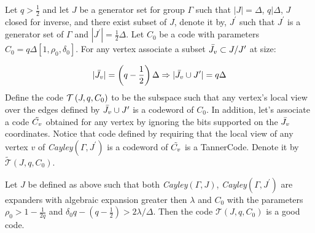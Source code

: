 \begin{definition}\label{testtaner} Let $q > \frac{1}{2}$ and let $J$ be a generator set for group $\Gamma$ such that $|J| = \Delta$, $q | \Delta $, $J$ closed for inverse, and there exist subset of $J$, denote it by, $J^{\prime}$ such that $J^{\prime}$ is a generator set of $\Gamma$ and $|J^{\prime}| = \frac{1}{2}\Delta$. Let $C_{0}$ be a code with parameters $C_{0} = q\Delta \left[1, \rho_{0}, \delta_{0}\right]$. For any vertex associate a subset $\bar{J_{v}} \subset J/J^{\prime}$ at size: 

  \begin{equation*}
    \begin{split}
      |\bar{J_{v}}| = \left( q - \frac{1}{2} \right)\Delta \Rightarrow |\bar{J_{v}} \cup J^{\prime}| = q\Delta
    \end{split}
  \end{equation*}
  Define the code $\mathcal{T}\left(J, q , C_{0}\right)$ to be the subspace such that any vertex's local view over the edges defined by $\bar{J_{v}} \cup J^{\prime}$ is a codeword of $C_{0}$. In addition, let's associate a code $\tilde{C_{v}}$ obtained for any vertex by ignoring the bits supported on the $\bar{J_{v}}$ coordinates. Notice that code defined by requiring that the local view of any vertex $v$ of \emph{Cayley}$\left(\Gamma, J^{\prime} \right)$ is a codeword of $\tilde{C_{v}}$ is a TannerCode. Denote it by $ \tilde{\mathcal{T}}\left(J, q ,C_{0}\right)$.   
\end{definition}
\begin{claim} Let $J$ be defined as above such that both \emph{Cayley}$\left( \Gamma, J \right)$, \emph{Cayley}$\left( \Gamma, J^{\prime} \right)$ are expanders with algebraic expansion greater then $\lambda$ and $C_0$ with the parameters $\rho_{0} > 1 - \frac{1}{2q}$ and $ \delta_{0}q - \left( q - \frac{1}{2} \right) > 2\lambda/\Delta$. Then the code $\mathcal{T}\left(J, q ,C_{0}\right)$ is a good code.\end{claim}
